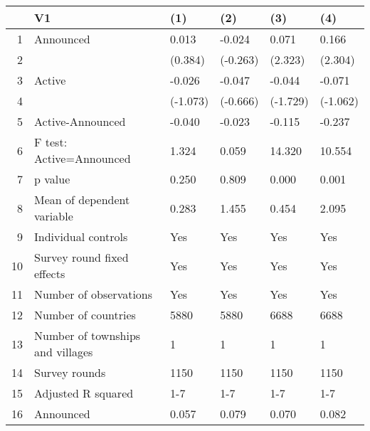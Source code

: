 \begin{table}[ht]
\centering
\begin{tabular}{rlllll}
  \hline
 & V1 & (1) & (2) & (3) & (4) \\ 
  \hline
1 & Announced & 0.013 & -0.024 & 0.071 & 0.166 \\ 
  2 &  & (0.384) & (-0.263) & (2.323) & (2.304) \\ 
  3 & Active & -0.026 & -0.047 & -0.044 & -0.071 \\ 
  4 &  & (-1.073) & (-0.666) & (-1.729) & (-1.062) \\ 
  5 & Active-Announced & -0.040 & -0.023 & -0.115 & -0.237 \\ 
  6 & F test: Active=Announced & 1.324 & 0.059 & 14.320 & 10.554 \\ 
  7 & p value & 0.250 & 0.809 & 0.000 & 0.001 \\ 
  8 & Mean of dependent variable & 0.283 & 1.455 & 0.454 & 2.095 \\ 
  9 & Individual controls & Yes & Yes & Yes & Yes \\ 
  10 & Survey round fixed effects & Yes & Yes & Yes & Yes \\ 
  11 & Number of observations & Yes & Yes & Yes & Yes \\ 
  12 & Number of countries & 5880 & 5880 & 6688 & 6688 \\ 
  13 & Number of townships and villages & 1 & 1 & 1 & 1 \\ 
  14 & Survey rounds & 1150 & 1150 & 1150 & 1150 \\ 
  15 & Adjusted R squared & 1-7 & 1-7 & 1-7 & 1-7 \\ 
  16 & Announced & 0.057 & 0.079 & 0.070 & 0.082 \\ 
   \hline
\end{tabular}
\end{table}
